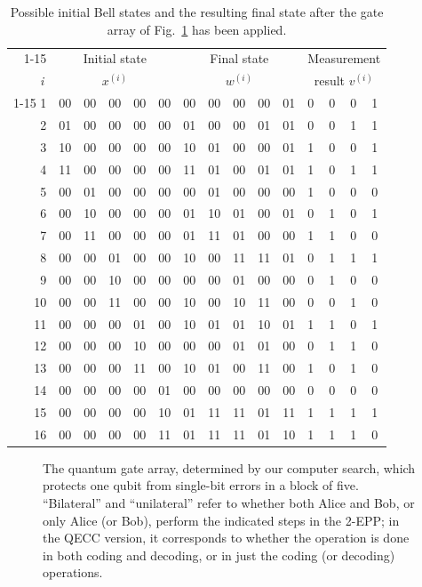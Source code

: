 \begin{table}[htbp]
\begin{tabular}{r|lllll|lllll|llll}
\cline{1-15}
&\multicolumn{5}{|c|}{Initial state}&\multicolumn{5}{c|}{Final state}&\multicolumn{4}{c}{Measurement}\\
{\it i$\:$}&\multicolumn{5}{|c|}{$x^{(i)}$}&\multicolumn{5}{c|}{$w^{(i)}$}&\multicolumn{4}{c}{result $v^{(i)}$}\\
\cline{1-15}
 1&00&00&00&00&00&00&00&00&00&01&0&0&0&1\\
 2&01&00&00&00&00&01&00&00&01&01&0&0&1&1\\
 3&10&00&00&00&00&10&01&00&00&01&1&0&0&1\\
 4&11&00&00&00&00&11&01&00&01&01&1&0&1&1\\
 5&00&01&00&00&00&00&01&00&00&00&1&0&0&0\\
 6&00&10&00&00&00&01&10&01&00&01&0&1&0&1\\
 7&00&11&00&00&00&01&11&01&00&00&1&1&0&0\\
 8&00&00&01&00&00&10&00&11&11&01&0&1&1&1\\
 9&00&00&10&00&00&00&00&01&00&00&0&1&0&0\\
10&00&00&11&00&00&10&00&10&11&00&0&0&1&0\\
11&00&00&00&01&00&10&01&01&10&01&1&1&0&1\\
12&00&00&00&10&00&00&00&01&01&00&0&1&1&0\\
13&00&00&00&11&00&10&01&00&11&00&1&0&1&0\\
14&00&00&00&00&01&00&00&00&00&00&0&0&0&0\\
15&00&00&00&00&10&01&11&11&01&11&1&1&1&1\\
16&00&00&00&00&11&01&11&11&01&10&1&1&1&0
\end{tabular}
\caption{Possible initial Bell states and the resulting final
state after the gate array of Fig.~\protect\ref{music} has been
applied.
\label{syndrome}}
\end{table}
 
\begin{figure}[p]
\centerline{}
\caption[music.eps]{The quantum gate array, determined by our computer search,
which protects one qubit from single-bit errors in a block of five.
``Bilateral'' and ``unilateral'' refer to whether both Alice and Bob,
or only Alice (or Bob), perform the indicated steps in the 2-EPP; in
the QECC version, it corresponds to whether the operation is done in
both coding and decoding, or in just the coding (or decoding)
operations.
\label{music}}
\end{figure}
 
